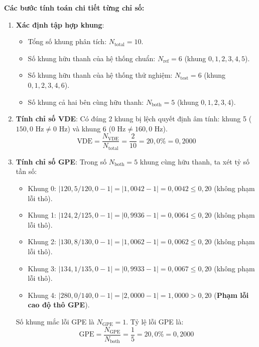\textbf{Các bước tính toán chi tiết từng chỉ số:}
\begin{enumerate}
    \item \textbf{Xác định tập hợp khung}:
    \begin{itemize}
        \item Tổng số khung phân tích: $N_{\text{total}} = 10$.
        \item Số khung hữu thanh của hệ thống chuẩn: $N_{\text{ref}} = 6$ (khung $0, 1, 2, 3, 4, 5$).
        \item Số khung hữu thanh của hệ thống thử nghiệm: $N_{\text{test}} = 6$ (khung $0, 1, 2, 3, 4, 6$).
        \item Số khung cả hai bên cùng hữu thanh: $N_{\text{both}} = 5$ (khung $0, 1, 2, 3, 4$).
    \end{itemize}

    \item \textbf{Tính chỉ số VDE}:
    Có đúng 2 khung bị lệch quyết định âm tính: khung 5 ($150{,}0\text{ Hz} \ne 0\text{ Hz}$) và khung 6 ($0\text{ Hz} \ne 160{,}0\text{ Hz}$).
    \begin{equation}
        \text{VDE} = \frac{N_{\text{VDE}}}{N_{\text{total}}} = \frac{2}{10} = 20{,}0\% = 0{,}2000
    \end{equation}

    \item \textbf{Tính chỉ số GPE}:
    Trong số $N_{\text{both}} = 5$ khung cùng hữu thanh, ta xét tỷ số tần số:
    \begin{itemize}
        \item Khung 0: $|120{,}5 / 120{,}0 - 1| = |1{,}0042 - 1| = 0{,}0042 \le 0{,}20$ (không phạm lỗi thô).
        \item Khung 1: $|124{,}2 / 125{,}0 - 1| = |0{,}9936 - 1| = 0{,}0064 \le 0{,}20$ (không phạm lỗi thô).
        \item Khung 2: $|130{,}8 / 130{,}0 - 1| = |1{,}0062 - 1| = 0{,}0062 \le 0{,}20$ (không phạm lỗi thô).
        \item Khung 3: $|134{,}1 / 135{,}0 - 1| = |0{,}9933 - 1| = 0{,}0067 \le 0{,}20$ (không phạm lỗi thô).
        \item Khung 4: $|280{,}0 / 140{,}0 - 1| = |2{,}0000 - 1| = 1{,}0000 > 0{,}20$ (\textbf{Phạm lỗi cao độ thô GPE}).
    \end{itemize}
    Số khung mắc lỗi GPE là $N_{\text{GPE}} = 1$. Tỷ lệ lỗi GPE là:
    \begin{equation}
        \text{GPE} = \frac{N_{\text{GPE}}}{N_{\text{both}}} = \frac{1}{5} = 20{,}0\% = 0{,}2000
    \end{equation}


\end{enumerate}
